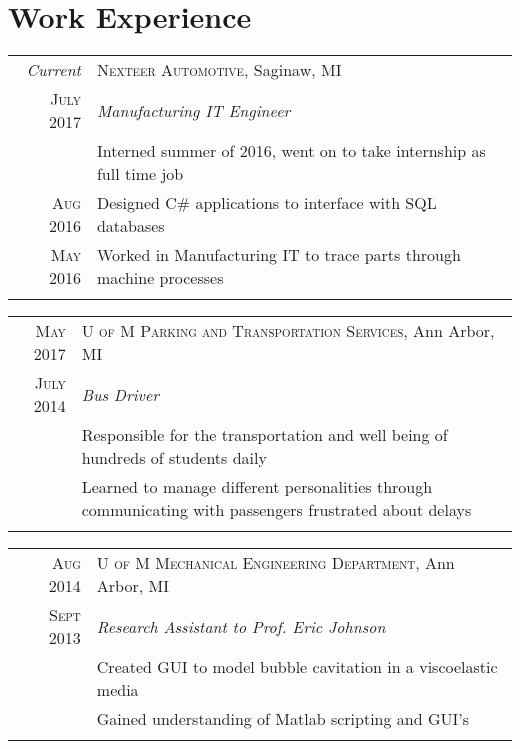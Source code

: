 \documentclass[a4paper,10pt]{article} %
\begin{document}

\section{Work Experience}

\begin{tabular}{r|p{13cm}}
\emph{Current} & \textsc{Nexteer Automotive}, Saginaw, MI \\
\textsc{July 2017} & \emph{Manufacturing IT Engineer} \\
& \footnotesize{Interned summer of 2016, went on to take internship as full time job}\\
\textsc{Aug 2016} & \footnotesize{Designed C\# applications to interface with SQL databases} \\
\textsc{May 2016} & \footnotesize{Worked in Manufacturing IT to trace parts through machine processes} \\
\multicolumn{2}{c}{} \\
\end{tabular}


\begin{tabular}{r|p{13cm}}
\textsc{May 2017} & \textsc{U of M Parking and Transportation Services}, Ann Arbor, MI\\
\textsc{July 2014} & \emph{Bus Driver} \\
& \footnotesize{Responsible for the transportation and well being of hundreds
  of students daily} \\
& \footnotesize{Learned to manage different personalities through communicating
  with passengers frustrated about delays} \\
\multicolumn{2}{c}{} \\
\end{tabular}


\begin{tabular}{r|p{13cm}}
\textsc{Aug 2014} & \textsc{U of M Mechanical Engineering Department}, Ann Arbor, MI \\
\textsc{Sept 2013} & \emph{Research Assistant to Prof. Eric Johnson} \\
& \footnotesize{Created GUI to model bubble cavitation in a viscoelastic media} \\
& \footnotesize{Gained understanding of Matlab scripting and GUI's} \\
\multicolumn{2}{c}{} \\
\end{tabular}
\end{document}
